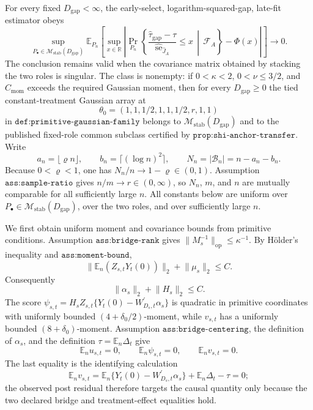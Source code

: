For every fixed \(D_{\mathrm{gap}}<\infty\), the early-select, logarithm-squared-gap, late-fit estimator obeys
\[
 \sup_{P_\bullet\in\mathcal M_{\mathrm{stab}}(D_{\mathrm{gap}})}
 \mathbb E_{P_n}\!\left[
  \sup_{x\in\mathbb R}
  \left|
   \Pr_{P_n}\!\left\{
    \frac{\widehat\tau_{\mathrm{gap}}-\tau}
         {\widehat{\operatorname{se}}_{\widehat J_A}}
    \leq x\,\middle|\,\mathcal F_A
   \right\}-\Phi(x)
  \right|
 \right]\longrightarrow0.
\]
The conclusion remains valid when the covariance matrix obtained by stacking the two roles is singular.  The class is nonempty: if \(0<\kappa<2\), \(0<\nu\leq3/2\), and \(C_{\mathrm{mom}}\) exceeds the required Gaussian moment, then for every \(D_{\mathrm{gap}}\geq0\) the tied constant-treatment Gaussian array at
\[
 \theta_0=(1,1,1/2,1,1,1/2,r,1,1)
\]
in \(\texttt{def:primitive-gaussian-family}\) belongs to \(\mathcal M_{\mathrm{stab}}(D_{\mathrm{gap}})\) and to the published fixed-role common subclass certified by \(\texttt{prop:shi-anchor-transfer}\).
Write
\[
 a_n=\lfloor\varrho n\rfloor,
 \qquad b_n=\lceil(\log n)^2\rceil,
 \qquad N_n=|\mathcal B_n|=n-a_n-b_n.
\]
Because \(0<\varrho<1\), one has \(N_n/n\to1-\varrho\in(0,1)\).  Assumption \(\texttt{ass:sample-ratio}\) gives \(n/m\to r\in(0,\infty)\), so \(N_n\), \(m\), and \(n\) are mutually comparable for all sufficiently large \(n\).  All constants below are uniform over \(P_\bullet\in\mathcal M_{\mathrm{stab}}(D_{\mathrm{gap}})\), over the two roles, and over sufficiently large \(n\).

We first obtain uniform moment and covariance bounds from primitive conditions.  Assumption \(\texttt{ass:bridge-rank}\) gives \(\lVert M_s^{-1}\rVert_{\mathrm{op}}\leq\kappa^{-1}\).  By H\"older's inequality and \(\texttt{ass:moment-bound}\),
\[
 \lVert\mathbb E_n(Z_{s,t}Y_t(0))\rVert_2
 +\lVert\mu_s\rVert_2\leq C.
\]
Consequently
\[
 \lVert\alpha_s\rVert_2+\lVert H_s\rVert_2\leq C.
\]
The score \(\psi_{s,t}=H_sZ_{s,t}\{Y_t(0)-W_{D_s,t}^{\prime}\alpha_s\}\) is quadratic in primitive coordinates with uniformly bounded \((4+\delta_0/2)\)-moment, while \(v_{s,t}\) has a uniformly bounded \((8+\delta_0)\)-moment.  Assumption \(\texttt{ass:bridge-centering}\), the definition of \(\alpha_s\), and the definition \(\tau=\mathbb E_n\Delta_t\) give
\[
 \mathbb E_n u_{s,t}=0,
 \qquad
 \mathbb E_n\psi_{s,t}=0,
 \qquad
 \mathbb E_n v_{s,t}=0.
\]
The last equality is the identifying calculation
\[
 \mathbb E_n v_{s,t}
 =\mathbb E_n\{Y_t(0)-W_{D_s,t}^{\prime}\alpha_s\}
  +\mathbb E_n\Delta_t-\tau=0;
\]
the observed post residual therefore targets the causal quantity only because the two declared bridge and treatment-effect equalities hold.

